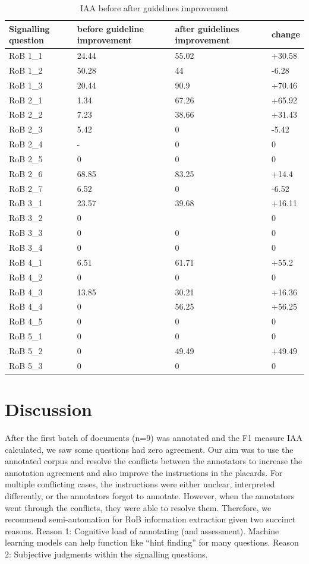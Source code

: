 \documentclass[sn-mathphys,Numbered]{sn-jnl}%
\theoremstyle{thmstyleone}%
\theoremstyle{thmstyletwo}%
\theoremstyle{thmstylethree}%
\begin{document}
%
%
%
\begin{table}[!ht]
    \caption{IAA before after guidelines improvement}
    \label{table:IAA_sq}
    \centering
    \begin{tabular}{llll}
    \hline
        Signalling question & before guideline improvement & after guidelines improvement & change \\
    \hline
        RoB 1\_1 & 24.44 & 55.02 & +30.58 \\ 
        RoB 1\_2 & 50.28 & 44 & -6.28 \\ 
        RoB 1\_3 & 20.44 & 90.9 & +70.46 \\ 
        RoB 2\_1 & 1.34 & 67.26 & +65.92 \\ 
        RoB 2\_2 & 7.23 & 38.66 & +31.43 \\ 
        RoB 2\_3 & 5.42 & 0 & -5.42 \\ 
        RoB 2\_4 & - & 0 & 0 \\ 
        RoB 2\_5 & 0 & 0 & 0 \\ 
        RoB 2\_6 & 68.85 & 83.25 & +14.4 \\ 
        RoB 2\_7 & 6.52 & 0 & -6.52 \\ 
        RoB 3\_1 & 23.57 & 39.68 & +16.11 \\ 
        RoB 3\_2 & 0 & ~ & 0 \\ 
        RoB 3\_3 & 0 & 0 & 0 \\ 
        RoB 3\_4 & 0 & 0 & 0 \\ 
        RoB 4\_1 & 6.51 & 61.71 & +55.2 \\ 
        RoB 4\_2 & 0 & 0 & 0 \\ 
        RoB 4\_3 & 13.85 & 30.21 & +16.36 \\ 
        RoB 4\_4 & 0 & 56.25 & +56.25 \\ 
        RoB 4\_5 & 0 & 0 & 0 \\ 
        RoB 5\_1 & 0 & 0 & 0 \\ 
        RoB 5\_2 & 0 & 49.49 & +49.49 \\ 
        RoB 5\_3 & 0 & 0 & 0 \\ \hline
    \end{tabular}
\end{table}
%
%
%
\section{Discussion}
\label{sec:discussion}
%
After the first batch of documents (n=9) was annotated and the F1 measure IAA calculated, we saw some questions had zero agreement.
Our aim was to use the annotated corpus and resolve the conflicts between the annotators to increase the annotation agreement and also improve the instructions in the placards.
For multiple conflicting cases, the instructions were either unclear, interpreted differently, or the annotators forgot to annotate.
However, when the annotators went through the conflicts, they were able to resolve them.
Therefore, we recommend semi-automation for RoB information extraction given two succinct reasons.
Reason 1: Cognitive load of annotating (and assessment). Machine learning models can help function like ``hint finding'' for many questions.
Reason 2: Subjective judgments within the signalling questions.
%
%
%
\end{document}
